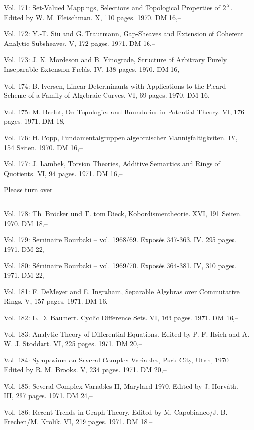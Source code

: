 Vol. 171: Set-Valued Mappings, Selections and Topological Properties of $2^X$. Edited by W. M. Fleischman. X, 110 pages. 1970. DM 16,--

Vol. 172: Y.-T. Siu and G. Trautmann, Gap-Sheaves and Extension of Coherent Analytic Subsheaves. V, 172 pages. 1971. DM 16,--

Vol. 173: J. N. Mordeson and B. Vinograde, Structure of Arbitrary Purely Inseparable Extension Fields. IV, 138 pages. 1970. DM 16,--

Vol. 174: B. Iversen, Linear Determinants with Applications to the Picard Scheme of a Family of Algebraic Curves. VI, 69 pages. 1970. DM 16,--

Vol. 175: M. Brelot, On Topologies and Boundaries in Potential Theory. VI, 176 pages. 1971. DM 18,--

Vol. 176: H. Popp, Fundamentalgruppen algebraischer Mannigfaltigkeiten. IV, 154 Seiten. 1970. DM 16,--

Vol. 177: J. Lambek, Torsion Theories, Additive Semantics and Rings of Quotients. VI, 94 pages. 1971. DM 16,--

Please turn over



\noindent\rule{\linewidth}{0.4pt}

Vol. 178: Th. Bröcker und T. tom Dieck, Kobordismentheorie. XVI, 191 Seiten. 1970. DM 18,--

Vol. 179: Seminaire Bourbaki -- vol. 1968/69. Exposés 347-363. IV. 295 pages. 1971. DM 22,--

Vol. 180: Séminaire Bourbaki -- vol. 1969/70. Exposés 364-381. IV, 310 pages. 1971. DM 22,--

Vol. 181: F. DeMeyer and E. Ingraham, Separable Algebras over Commutative Rings. V, 157 pages. 1971. DM 16.--

Vol. 182: L. D. Baumert. Cyclic Difference Sets. VI, 166 pages. 1971. DM 16,--

Vol. 183: Analytic Theory of Differential Equations. Edited by P. F. Hsieh and A. W. J. Stoddart. VI, 225 pages. 1971. DM 20,--

Vol. 184: Symposium on Several Complex Variables, Park City, Utah, 1970. Edited by R. M. Brooks. V, 234 pages. 1971. DM 20,--

Vol. 185: Several Complex Variables II, Maryland 1970. Edited by J. Horváth. III, 287 pages. 1971. DM 24,--

Vol. 186: Recent Trends in Graph Theory. Edited by M. Capobianco/J. B. Frechen/M. Krolik. VI, 219 pages. 1971. DM 18.--

